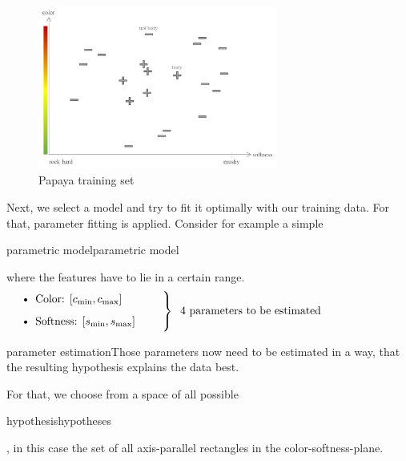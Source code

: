 \begin{figure}[h]
  \centering
  \includegraphics[width=0.7\textwidth]{assets/slf/papaya_testdata__0.png} 
  \caption{Papaya training set}
  \label{fig:1_training_set}
\end{figure}

Next, we select a model and try to fit it optimally with our training data. For that, parameter fitting is applied.
Consider for example a simple \begin{tikzborder}{parametric model}{parametric model}\end{tikzborder} where the features have to lie in a certain range.
\begin{equation*}
  \begin{array}{@{}l@{}}
      \begin{minipage}[b]{0.4\textwidth}
          \begin{itemize}
              \item Color: $[c_{\min}, c_{\max}]$
              \item Softness: $[s_{\min}, s_{\max}]$
          \end{itemize}
      \end{minipage}
  \end{array}
  \left.\begin{array}{@{}c@{}}
      \\
      \\
      \\
  \end{array}\right\}\hspace*{0.2cm}\begin{minipage}{0.6\textwidth}
    4 parameters to be estimated
\end{minipage}
\end{equation*}

\begin{tikzborder}{parameter estimation}Those parameters now need to be estimated in a way, that the resulting hypothesis explains the data best.\end{tikzborder} For that, we choose from a space of all possible \begin{tikzborder}{hypothesis}hypotheses\end{tikzborder}, in this case the set of all axis-parallel rectangles in the color-softness-plane.

